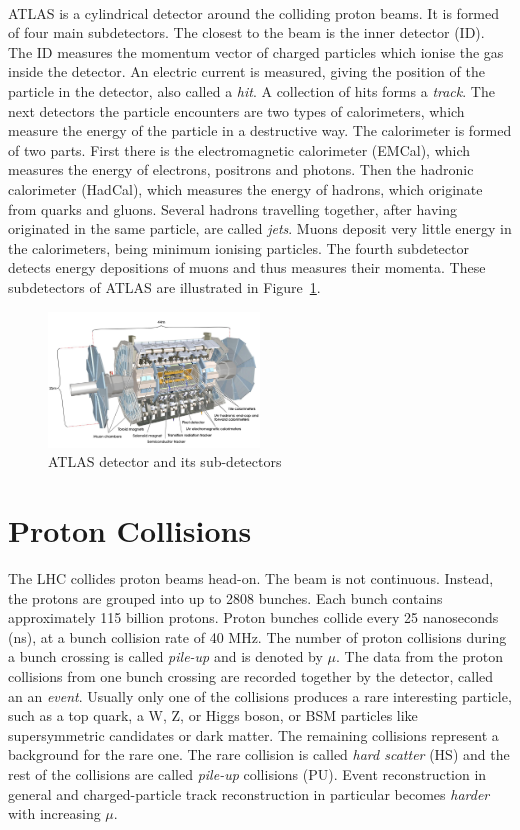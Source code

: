 \ \\ATLAS is a cylindrical detector around the colliding proton beams. It is formed of four main subdetectors. The closest to the beam is the inner detector (ID). The ID measures the momentum vector of charged particles which ionise the gas inside the detector. An electric current is measured, giving the position of the particle in the detector, also called a \emph{hit}. A collection of hits forms a \emph{track}. The next detectors the particle encounters are two types of calorimeters, which measure the energy of the particle in a destructive way. The calorimeter is formed of two parts. First there is the electromagnetic calorimeter (EMCal), which measures the energy of electrons, positrons and photons. Then the hadronic calorimeter (HadCal), which measures the energy of hadrons, which originate from quarks and gluons. Several hadrons travelling together, after having originated in the same particle, are called \emph{jets}. Muons deposit very little energy in the calorimeters, being minimum ionising particles. The fourth subdetector detects energy depositions of muons and thus measures their momenta. These subdetectors of ATLAS are illustrated in Figure~\ref{fig:ATLAS}.

\begin{figure}[!htb]
  \centering
  \includegraphics[width=0.5\textwidth]{plots/ATLAS.jpg} 
  \caption{ATLAS detector and its sub-detectors}
  \label{fig:ATLAS}
\end{figure}

\section{Proton Collisions}
\label{sec:ProtonCollisions}

The LHC collides proton beams head-on. The beam is not continuous. Instead, the protons are grouped into up to 2808 bunches. Each bunch contains approximately 115 billion protons. Proton bunches collide every 25 nanoseconds (ns), at a bunch collision rate of 40 MHz. The number of proton collisions during a bunch crossing is called \emph{pile-up} and is denoted by $\mu$. The data from the proton collisions from one bunch crossing are recorded together by the detector, called an an \emph{event}. Usually only one of the collisions produces a rare interesting particle, such as a top quark, a W, Z, or Higgs boson, or BSM particles like supersymmetric candidates or dark matter. The remaining collisions represent a background for the rare one. The rare collision is called \emph{hard scatter} (HS) and the rest of the collisions are called \emph{pile-up} collisions (PU). Event reconstruction in general and charged-particle track reconstruction in particular becomes \emph{harder} with increasing $\mu$. 

